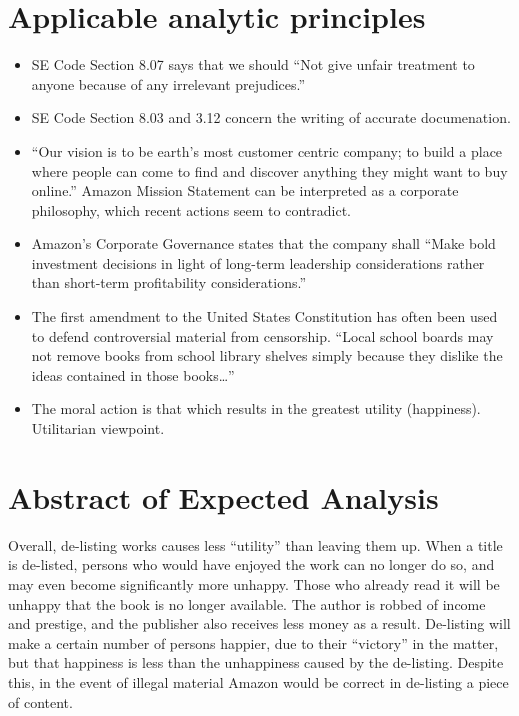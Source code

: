 \documentclass[12pt]{article}
\begin{document}
\section{Applicable analytic principles}
\begin{itemize}
\item SE Code Section 8.07 says that we should ``Not give unfair treatment to anyone because of any irrelevant prejudices.'' \cite{secode}

\item SE Code Section 8.03 and 3.12 concern the writing of accurate documenation. \cite{secode}

\item ``Our vision is to be earth's most customer centric company; to build a place where people can come to find and discover anything they might want to buy online.'' Amazon Mission Statement can be interpreted as a corporate philosophy, which recent actions seem to contradict. \cite{AmazonIRFAQ}

\item Amazon's Corporate Governance states that the company shall ``Make bold investment decisions in light of long-term leadership considerations rather than short-term profitability considerations.'' \cite{AmazonCorpGovernance}

\item The first amendment to the United States Constitution has often been used to defend controversial material from censorship.  ``Local school boards may not remove books from school library shelves simply because they dislike the ideas contained in those books\ldots'' \cite{BOEvsPico}

\item The moral action is that which results in the greatest utility (happiness).  Utilitarian viewpoint.

\end{itemize}

\section{Abstract of Expected Analysis}
Overall, de-listing works causes less ``utility'' than leaving them up.  When a title is de-listed, persons who would have enjoyed the work can no longer do so, and may even become significantly more unhappy.  Those who already read it will be unhappy that the book is no longer available.  The author is robbed of income and prestige, and the publisher also receives less money as a result.  De-listing will make a certain number of persons happier, due to their ``victory'' in the matter, but that happiness is less than the unhappiness caused by the de-listing.  Despite this, in the event of illegal material Amazon would be correct in de-listing a piece of content.
\end{document}
